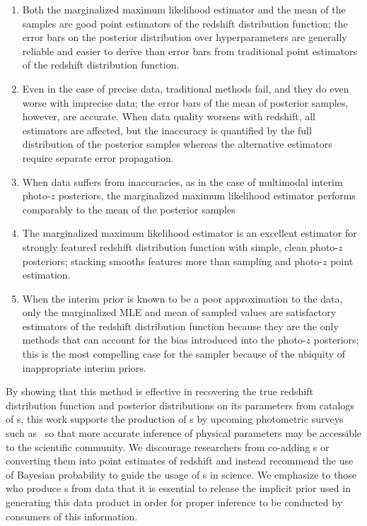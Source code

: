 \begin{enumerate}
	\item Both the marginalized maximum likelihood estimator and the mean of the samples are good point estimators of the redshift distribution function; the error bars on the posterior distribution over hyperparameters are generally reliable and easier to derive than error bars from traditional point estimators of the redshift distribution function.
	\item Even in the case of precise data, traditional methods fail, and they do even worse with imprecise data; the error bars of the mean of posterior samples, however, are accurate.  When data quality worsens with redshift, all estimators are affected, but the inaccuracy is quantified by the full distribution of the posterior samples whereas the alternative estimators require separate error propagation.  
	\item When data suffers from inaccuracies, as in the case of multimodal interim photo-$z$ posteriors, the marginalized maximum likelihood estimator performs comparably to the mean of the posterior samples
	\item The marginalized maximum likelihood estimator is an excellent estimator for strongly featured redshift distribution function with simple, clean photo-$z$ posteriors; stacking smooths features more than sampling and photo-$z$ point estimation.
	\item When the interim prior is known to be a poor approximation to the data, only the marginalized MLE and mean of sampled values are satisfactory estimators of the redshift distribution function because they are the only methods that can account for the bias introduced into the photo-$z$ posteriors; this is the most compelling case for the sampler because of the ubiquity of inappropriate interim priors.
\end{enumerate}

By showing that this method is effective in recovering the true redshift distribution function and posterior distributions on its parameters from catalogs of \pzpdf s, this work supports the production of \pzpdf s by upcoming photometric surveys such as \lsst\ so that more accurate inference of physical parameters may be accessible to the scientific community.  
We discourage researchers from co-adding \pzpdf s or converting them into point estimates of redshift and instead recommend the use of Bayesian probability to guide the usage of \pzpdf s in science.  
We emphasize to those who produce \pzpdf s from data that it is essential to release the implicit prior used in generating this data product in order for proper inference to be conducted by consumers of this information.

